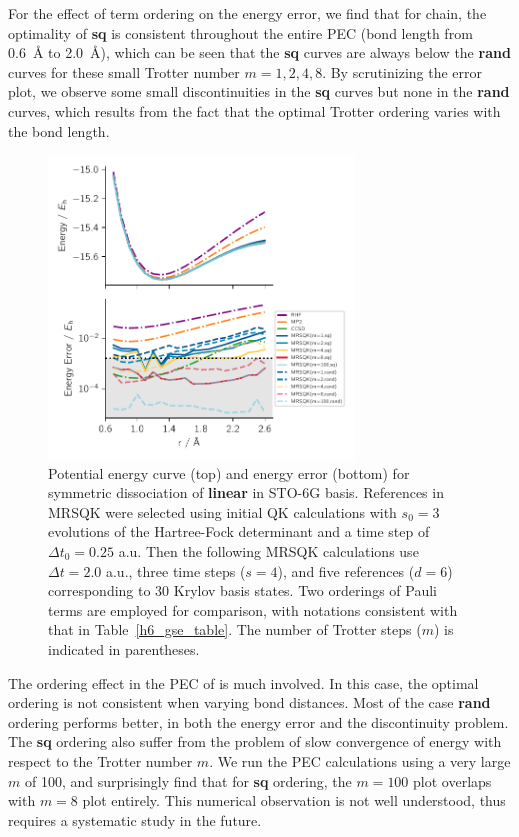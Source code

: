 \documentclass[journal=jctcce,manuscript=article]{achemso}
\newcommand{\methodabbr}[0]{MRSQK\xspace}
\begin{document}
For the effect of term ordering on the energy error, we find that for  chain, the optimality of \textbf{sq} is consistent throughout the entire PEC (bond length from 0.6~\AA{}  to 2.0~\AA), which can be seen that the \textbf{sq} curves are always below the \textbf{rand} curves for these small Trotter number $m=1, 2, 4, 8$.
By scrutinizing the error plot, we observe some small discontinuities in the \textbf{sq} curves but none in the \textbf{rand} curves, which results from the fact that the optimal Trotter ordering varies with the bond length.\cite{tranter2019ordering}

\begin{figure}[h!]
  \centering
  \includegraphics[width=3.2in]{figs/BeH2_pes_error.pdf}
  \caption{Potential energy curve (top) and energy error (bottom) for symmetric dissociation of \textbf{linear } in STO-6G basis.
  References in \methodabbr were selected using initial QK calculations with $s_0 = 3$ evolutions of the Hartree-Fock determinant and a time step of $ \Delta t_0 = 0.25$ a.u.
  Then the following \methodabbr calculations use $ \Delta t = 2.0$ a.u., three time steps ($s=4$), and five references ($d=6$) corresponding to 30 Krylov basis states. 
  Two orderings of Pauli terms are employed for comparison, with notations consistent with that in Table~\ref{h6_gse_table}.
  The number of Trotter steps ($m$) is indicated in parentheses.
   }
\label{beh2_pes}
\end{figure}

The ordering effect in the PEC of  is much involved. In this case, the optimal ordering is not consistent when varying bond distances.
Most of the case \textbf{rand} ordering performs better, in both the energy error and the discontinuity problem. The \textbf{sq} ordering also suffer from the problem of slow convergence of energy with respect to the Trotter number $m$. We run the PEC calculations using a very large $m$ of 100, and surprisingly find that for \textbf{sq} ordering, the $m=100$ plot overlaps with $m=8$ plot entirely. This numerical observation is not well understood, thus requires a systematic study in the future.
\end{document}
